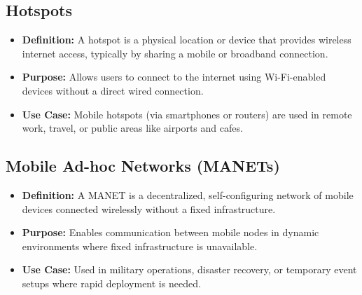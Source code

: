 \subsection{Hotspots}
\begin{itemize}[leftmargin=1.5cm]
  \item \textbf{Definition:} A hotspot is a physical location or device that provides wireless internet access, typically by sharing a mobile or broadband connection.
  \item \textbf{Purpose:} Allows users to connect to the internet using Wi-Fi-enabled devices without a direct wired connection.
  \item \textbf{Use Case:} Mobile hotspots (via smartphones or routers) are used in remote work, travel, or public areas like airports and cafes.
\end{itemize}

\subsection{Mobile Ad-hoc Networks (MANETs)}
\begin{itemize}[leftmargin=1.5cm]
  \item \textbf{Definition:} A MANET is a decentralized, self-configuring network of mobile devices connected wirelessly without a fixed infrastructure.
  \item \textbf{Purpose:} Enables communication between mobile nodes in dynamic environments where fixed infrastructure is unavailable.
  \item \textbf{Use Case:} Used in military operations, disaster recovery, or temporary event setups where rapid deployment is needed.
\end{itemize}
